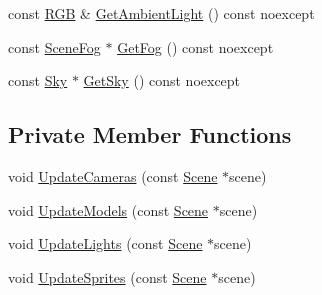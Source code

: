 \begin{DoxyCompactItemize}
\item 
const \hyperlink{structmage_1_1_r_g_b}{R\+GB} \& \hyperlink{structmage_1_1_pass_buffer_a378e1794878a8461eabee26d065583b9}{Get\+Ambient\+Light} () const noexcept
\item 
const \hyperlink{classmage_1_1_scene_fog}{Scene\+Fog} $\ast$ \hyperlink{structmage_1_1_pass_buffer_a406b7dcb655d3689f0a4400edc2e9bf8}{Get\+Fog} () const noexcept
\item 
const \hyperlink{classmage_1_1_sky}{Sky} $\ast$ \hyperlink{structmage_1_1_pass_buffer_af6355cb9bd927f53bb93347348f21a11}{Get\+Sky} () const noexcept
\end{DoxyCompactItemize}
\subsection*{Private Member Functions}
\begin{DoxyCompactItemize}
\item 
void \hyperlink{structmage_1_1_pass_buffer_a1ded2ce7cadbcb176aec69a85ba81c3e}{Update\+Cameras} (const \hyperlink{classmage_1_1_scene}{Scene} $\ast$scene)
\item 
void \hyperlink{structmage_1_1_pass_buffer_a02d68f950566e8283d3fc74bdf19b66a}{Update\+Models} (const \hyperlink{classmage_1_1_scene}{Scene} $\ast$scene)
\item 
void \hyperlink{structmage_1_1_pass_buffer_a91a779121ecb4c08605d3073c34674c9}{Update\+Lights} (const \hyperlink{classmage_1_1_scene}{Scene} $\ast$scene)
\item 
void \hyperlink{structmage_1_1_pass_buffer_a8301fd646965c627f29120f412078ca1}{Update\+Sprites} (const \hyperlink{classmage_1_1_scene}{Scene} $\ast$scene)
\end{DoxyCompactItemize}
